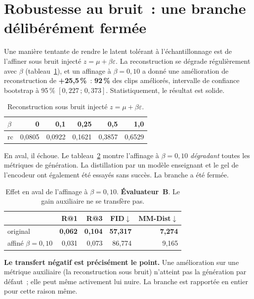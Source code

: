 \documentclass[12pt,a4paper,oneside]{report}
\theoremstyle{definition}
\theoremstyle{plain}
\newcommand{\rc}{\mathrm{rc}}
\begin{document}
\section{Robustesse au bruit~: une branche délibérément fermée}
\label{sec:noise}

Une manière tentante de rendre le latent tolérant à l'échantillonnage est de
l'affiner sous bruit injecté $z=\mu+\beta\varepsilon$. La reconstruction se
dégrade régulièrement avec $\beta$ (tableau~\ref{tab:noise}), et un affinage à
$\beta=0{,}10$ a donné une amélioration de reconstruction de \textbf{+25,5\,\%}~:
\textbf{92\,\%} des clips améliorés, intervalle de confiance bootstrap à 95\,\%
$[0{,}227\,;\,0{,}373]$. Statistiquement, le résultat est solide.

\begin{table}[ht]
\centering
\caption{Reconstruction sous bruit injecté $z=\mu+\beta\varepsilon$.}
\label{tab:noise}
\small
\begin{tabular}{@{}lrrrrr@{}}
\toprule
$\beta$ & 0 & 0,1 & 0,25 & 0,5 & 1,0 \\
\midrule
$\rc$ & 0,0805 & 0,0922 & 0,1621 & 0,3857 & 0,6529 \\
\bottomrule
\end{tabular}
\end{table}

En aval, il échoue. Le tableau~\ref{tab:noisedown} montre l'affinage à
$\beta=0{,}10$ \emph{dégradant} toutes les métriques de génération. La distillation
par un modèle enseignant et le gel de l'encodeur ont également été essayés sans
succès. La branche a été fermée.

\begin{table}[ht]
\centering
\caption{Effet en aval de l'affinage à $\beta=0{,}10$. \textbf{Évaluateur~B}. Le
gain auxiliaire ne se transfère pas.}
\label{tab:noisedown}
\small
\begin{tabular}{@{}lrrrr@{}}
\toprule
 & R@1 & R@3 & FID$\downarrow$ & MM-Dist$\downarrow$ \\
\midrule
original & \textbf{0,062} & \textbf{0,104} & \textbf{57,317} & \textbf{7,274} \\
affiné $\beta=0{,}10$ & 0,031 & 0,073 & 86,774 & 9,165 \\
\bottomrule
\end{tabular}
\end{table}

\textbf{Le transfert négatif est précisément le point.} Une amélioration sur une
métrique auxiliaire (la reconstruction sous bruit) n'atteint pas la génération par
défaut~; elle peut même activement lui nuire. La branche est rapportée en entier
pour cette raison même.
\end{document}
